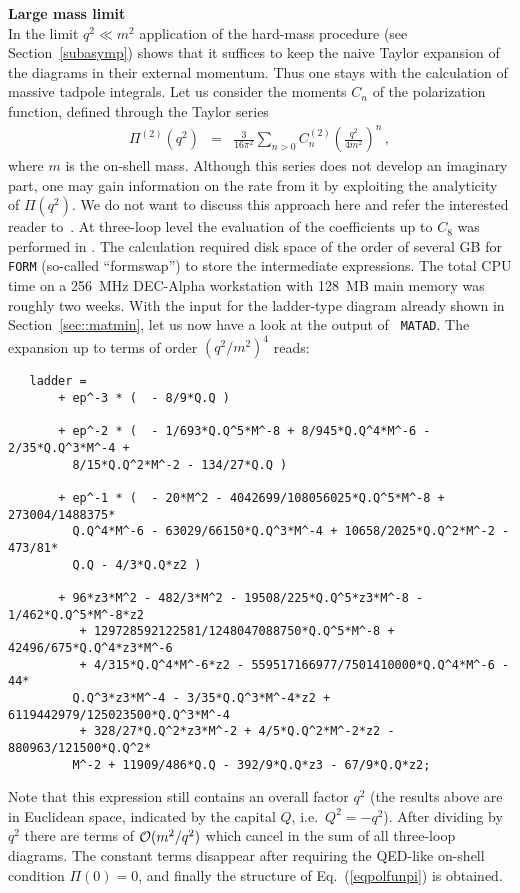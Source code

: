 %
\vspace{4ex}
{\bf Large mass limit}\\[2ex]
%
In the limit $q^2\ll m^2$ application of the hard-mass procedure (see
Section~\ref{subasymp}) shows that it suffices to keep the naive Taylor expansion
of the diagrams in their external momentum. Thus one stays with the
calculation of massive tadpole integrals. Let us consider the moments $C_n$ of
the polarization function, defined through the Taylor series
\begin{eqnarray}
\Pi^{(2)}(q^2) &=& 
              \frac{3}{16\pi^2}
              \sum_{n>0} C_{n}^{(2)} \left(\frac{q^2}{4m^2}\right)^n
\,,
\label{eqpolfunpi}
\end{eqnarray}
where $m$ is the on-shell mass.
Although this series does not develop an imaginary part, one may gain
information on the rate from it by exploiting the analyticity of
$\Pi(q^2)$. We do not want to discuss this approach here and refer the
interested reader to~\cite{BaiBro95,CheKueSte96}.  At three-loop level
the evaluation of the coefficients up to $C_8$ was performed in
\cite{CheKueSte96}. The calculation required disk space of the order of
several GB for {\tt FORM} (so-called ``formswap'') to store the
intermediate expressions.  The total CPU time on a 256~MHz DEC-Alpha
workstation with 128~MB main memory was roughly two weeks.  With the
input for the ladder-type diagram already shown in
Section~\ref{sec::matmin}, let us now have a look at the output of {\tt
  MATAD}. The expansion up to terms of order $(q^2/m^2)^4$ reads:
\begin{verbatim}
   ladder =
       + ep^-3 * (  - 8/9*Q.Q )

       + ep^-2 * (  - 1/693*Q.Q^5*M^-8 + 8/945*Q.Q^4*M^-6 - 2/35*Q.Q^3*M^-4 + 
         8/15*Q.Q^2*M^-2 - 134/27*Q.Q )

       + ep^-1 * (  - 20*M^2 - 4042699/108056025*Q.Q^5*M^-8 + 273004/1488375*
         Q.Q^4*M^-6 - 63029/66150*Q.Q^3*M^-4 + 10658/2025*Q.Q^2*M^-2 - 473/81*
         Q.Q - 4/3*Q.Q*z2 )

       + 96*z3*M^2 - 482/3*M^2 - 19508/225*Q.Q^5*z3*M^-8 - 1/462*Q.Q^5*M^-8*z2
          + 129728592122581/1248047088750*Q.Q^5*M^-8 + 42496/675*Q.Q^4*z3*M^-6
          + 4/315*Q.Q^4*M^-6*z2 - 559517166977/7501410000*Q.Q^4*M^-6 - 44*
         Q.Q^3*z3*M^-4 - 3/35*Q.Q^3*M^-4*z2 + 6119442979/125023500*Q.Q^3*M^-4
          + 328/27*Q.Q^2*z3*M^-2 + 4/5*Q.Q^2*M^-2*z2 - 880963/121500*Q.Q^2*
         M^-2 + 11909/486*Q.Q - 392/9*Q.Q*z3 - 67/9*Q.Q*z2;
\end{verbatim}
Note that this expression still contains an overall factor $q^2$ (the
results above are in Euclidean space, indicated by the capital $Q$,
i.e.\ $Q^2 = -q^2$).  After dividing by $q^2$ there are terms of ${\cal
  O}(m^2/q^2)$ which cancel in the sum of all three-loop diagrams.  The
constant terms disappear after requiring the QED-like on-shell condition
$\Pi(0)=0$, and finally the structure of Eq.~(\ref{eqpolfunpi}) is
obtained.

